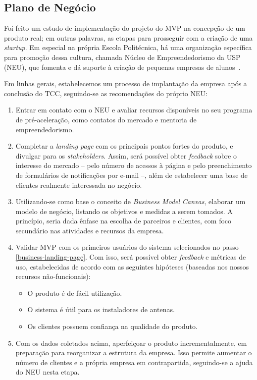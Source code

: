 \documentclass[]{politex}
\begin{document}
\subsection{Plano de Negócio}

Foi feito um estudo de implementação do projeto do MVP na concepção de
um produto real; em outras palavras, as etapas para prosseguir com a criação
de uma \textit{startup}. Em especial na própria Escola Politécnica, há uma
organização específica para promoção dessa cultura, chamada Núcleo de
Empreendedorismo da USP (NEU), que fomenta e dá suporte à criação de pequenas
empresas de alunos~\cite{neu}.

Em linhas gerais, estabelecemos um processo de implantação da empresa após a
conclusão do TCC, seguindo-se as recomendações do próprio NEU:

\begin{enumerate}
\item Entrar em contato com o NEU e avaliar recursos disponíveis no seu
programa de pré-aceleração, como contatos do mercado e mentoria de
empreendedorismo.
\item\label{business-landing-page} Completar a \textit{landing page} com os
principais pontos fortes do produto, e divulgar para os \textit{stakeholders}.
Assim, será possível obter \textit{feedback} sobre o interesse do mercado --
pelo número de acessos à página e pelo preenchimento de formulários de
notificações por e-mail --, além de estabelecer uma base de clientes realmente
interessada no negócio.
\item Utilizando-se como base o conceito de \textit{Business Model Canvas},
elaborar um modelo de negócio, listando os objetivos e medidas a serem tomados.
A princípio, seria dada ênfase na escolha de parceiros e clientes, com foco
secundário nas atividades e recursos da empresa.
\item Validar MVP com os primeiros usuários do sistema selecionados no passo
\ref{business-landing-page}. Com isso, será possível obter \textit{feedback} e
métricas de uso, estabelecidas de acordo com as seguintes hipóteses (baseadas
nos nossos recursos não-funcionais):
\begin{itemize}
\item O produto é de fácil utilização.
\item O sistema é útil para os instaladores de antenas.
\item Os clientes possuem confiança na qualidade do produto.
\end{itemize}
\item Com os dados coletados acima, aperfeiçoar o produto incrementalmente, em
preparação para reorganizar a estrutura da empresa. Isso permite aumentar o
número de clientes e a própria empresa em contrapartida, seguindo-se a ajuda
do NEU nesta etapa.
\end{enumerate}
\end{document}
